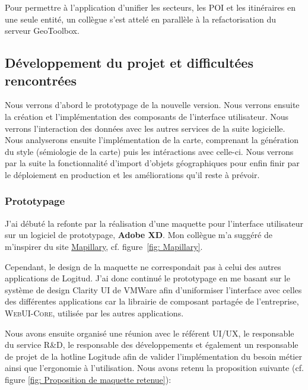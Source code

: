 \documentclass{rapportUHA40}
\begin{document}
Pour permettre à l'application d'unifier les secteurs, les POI et les
itinéraires en une seule entité, un collègue s'est attelé en parallèle à la
refactorisation du serveur GeoToolbox.

\subsection{Développement du projet et difficultées rencontrées}
Nous verrons d'abord le prototypage de la nouvelle version. Nous verrons
ensuite la création et l'implémentation des composants de l'interface
utilisateur. Nous verrons l'interaction des données avec les autres services de
la suite logicielle. Nous analyserons ensuite l'implémentation de la carte,
comprenant la génération du style (sémiologie de la carte) puis les
intéractions avec celle-ci. Nous verrons par la suite la fonctionnalité
d'import d'objets géographiques pour enfin finir par le déploiement en
production et les améliorations qu'il reste à prévoir.\\

\subsubsection{Prototypage}
J'ai débuté la refonte par la réalisation d'une maquette pour l'interface
utilisateur sur un logiciel de prototypage, \textbf{Adobe XD}. Mon collègue m'a
suggéré de m'inspirer du site \href{https://www.mapillary.com/app/}{Mapillary},
cf. figure~\ref{fig: Mapillary}.

Cependant, le design de la maquette ne correspondait pas à celui des autres
applications de Logitud. J'ai donc continué le prototypage en me basant sur le
système de design Clarity UI de VMWare afin d'uniformiser l'interface avec
celles des différentes applications car la librairie de composant partagée de
l'entreprise, \textsc{WebUI-Core}, utilisée par les autres applications.

Nous avons ensuite organisé une réunion avec le référent UI/UX, le responsable
du service R\&D, le responsable des développements et également un responsable
de projet de la hotline Logitude afin de valider l'implémentation du besoin
métier ainsi que l'ergonomie à l'utilisation. Nous avons retenu la proposition
suivante (cf. figure \ref{fig: Proposition de maquette retenue}):
\end{document}

